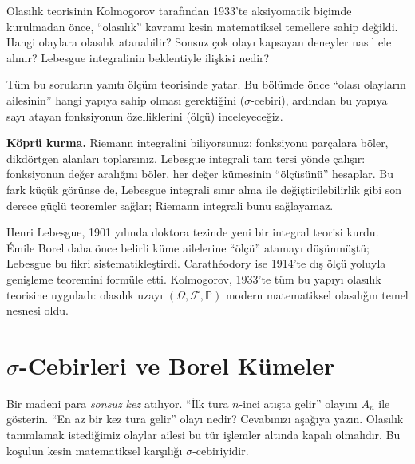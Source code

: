 \begin{motivasyon}
Olasılık teorisinin Kolmogorov tarafından 1933'te aksiyomatik biçimde
kurulmadan önce, ``olasılık'' kavramı kesin matematiksel temellere sahip
değildi. Hangi olaylara olasılık atanabilir? Sonsuz çok olayı kapsayan
deneyler nasıl ele alınır? Lebesgue integralinin beklentiyle ilişkisi nedir?

Tüm bu soruların yanıtı ölçüm teorisinde yatar. Bu bölümde önce ``olası
olayların ailesinin'' hangi yapıya sahip olması gerektiğini ($\sigma$-cebiri),
ardından bu yapıya sayı atayan fonksiyonun özelliklerini (ölçü) inceleyeceğiz.

\medskip

\textbf{Köprü kurma.} Riemann integralini biliyorsunuz: fonksiyonu parçalara böler,
dikdörtgen alanları toplarsınız. Lebesgue integrali tam tersi yönde çalışır:
fonksiyonun değer aralığını böler, her değer kümesinin ``ölçüsünü'' hesaplar.
Bu fark küçük görünse de, Lebesgue integrali sınır alma ile değiştirilebilirlik
gibi son derece güçlü teoremler sağlar; Riemann integrali bunu sağlayamaz.
\end{motivasyon}

\begin{tarihselnot}
Henri Lebesgue, 1901 yılında doktora tezinde yeni bir integral teorisi kurdu.
Émile Borel daha önce belirli küme ailelerine ``ölçü'' atamayı düşünmüştü;
Lebesgue bu fikri sistematikleştirdi. Carathéodory ise 1914'te dış ölçü
yoluyla genişleme teoremini formüle etti. Kolmogorov, 1933'te tüm bu yapıyı
olasılık teorisine uyguladı: olasılık uzayı $(\Omega, \mathcal{F}, \mathbb{P})$
modern matematiksel olasılığın temel nesnesi oldu.
\end{tarihselnot}


\section{$\sigma$-Cebirleri ve Borel Kümeler}

\begin{kesif}
Bir madeni para \emph{sonsuz kez} atılıyor. ``İlk tura $n$-inci atışta gelir''
olayını $A_n$ ile gösterin. ``En az bir kez tura gelir'' olayı nedir?
Cevabınızı aşağıya yazın.
Olasılık tanımlamak istediğimiz olaylar ailesi bu tür işlemler altında kapalı
olmalıdır. Bu koşulun kesin matematiksel karşılığı $\sigma$-cebiriyidir.
\end{kesif}

